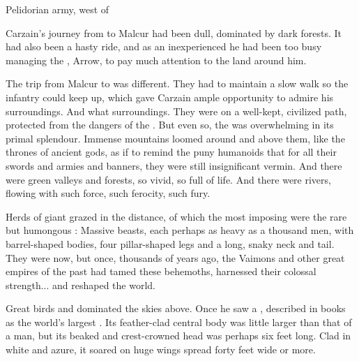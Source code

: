 \bookchapter{\Forklin}

\begin{comment}
\section{\Forklin}
\end{comment}

\begin{comment}
\subsection{The \Wylde{}}
\end{comment}

\stamp
  {\dateCarzainFirstInForklin}
  {Pelidorian army, west of \Forklin}

Carzain's journey from \Redglen{} to Malcur had been dull, dominated by dark forests. 
It had also been a hasty ride, and as an inexperienced \relcer{} he had been too busy managing the \relc, Arrow, to pay much attention to the land around him. 

The trip from Malcur to \Forklin{} was different. 
They had to maintain a slow walk so the infantry could keep up, which gave Carzain ample opportunity to admire his surroundings. 
And what surroundings. 
They were on a well-kept, civilized path, protected from the dangers of the \Wylde{}. 
But even so, the \Wylde{} was overwhelming in its primal splendour. 
Immense mountains loomed around and above them, like the thrones of ancient gods, as if to remind the puny humanoids that for all their swords and armies and banners, they were still insignificant vermin. 
And there were green valleys and forests, so vivid, so full of life. 
And there were rivers, flowing with such force, such ferocity, such fury. 

Herds of giant \saurians{} grazed in the distance, of which the most imposing were the rare but humongous \tondras{}: 
Massive beasts, each perhaps as heavy as a thousand men, with barrel-shaped bodies, four pillar-shaped legs and a long, snaky neck and tail. 
They were \Wylde{} now, but once, thousands of years ago, the Vaimons and other great empires of the past had tamed these behemoths, harnessed their colossal strength... and reshaped the world. 

Great birds and \pterans dominated the skies above. 
Once he saw a \quilrai, described in books as the world's largest \pteran. 
Its feather-clad central body was little larger than that of a man, but 
its beaked and crest-crowned head was perhaps six feet long. 
Clad in white and azure, it soared on huge wings spread forty feet wide or more. 

